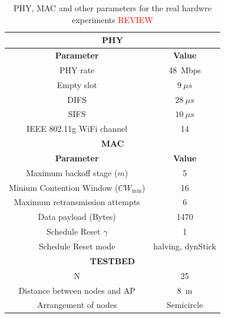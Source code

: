 	\begin{table}
		\centering
		\caption{PHY, MAC and other parameters for the real hardwre experiments \textcolor{red}{REVIEW}}
		\label{tab:testbed}
		\begin{tabular}{|c|c|}
			\hline
			\multicolumn{2}{|c|}{{\bfseries PHY}}\\
			\hline
			{\bfseries Parameter} & {\bfseries Value}\\
			\hline
			PHY rate & 48~Mbps\\
			Empty slot & $9~\mu s$\\
			DIFS & $28~\mu s$\\
			SIFS & $10~\mu s$\\
			IEEE 802.11g WiFi channel & 14\\
			\hline
			\multicolumn{2}{|c|}{{\bfseries MAC}}\\
			\hline
			{\bfseries Parameter} & {\bfseries Value}\\
			\hline
			Maximum backoff stage ($m$) & 5\\
			Minium Contention Window ($CW_{\min}$) & 16\\
			Maximum retransmission attempts & 6\\
			Data payload (Bytes) & 1470\\
			Schedule Reset $\gamma$ & 1\\
			Schedule Reset mode & halving, dynStick\\
			\hline
			\multicolumn{2}{|c|}{{\bfseries TESTBED}}\\
			\hline
			N & 25\\
			Distance between nodes and AP & 8~m\\
			Arrangement of nodes & Semicircle\\
			\hline
		\end{tabular}
	\end{table}

